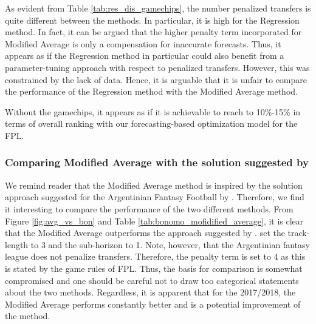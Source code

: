 \newpar

As evident from Table \ref{tab:res_dis_gamechips}, the number penalized transfers is quite different between the methods. In particular, it is high for the Regression method. In fact, it can be argued that the higher penalty term incorporated for Modified Average is only a compensation for inaccurate forecasts. Thus, it appears as if the Regression method in particular could also benefit from a parameter-tuning approach with respect to penalized transfers. However, this was constrained by the lack of data. Hence, it is arguable that it is unfair to compare the performance of the Regression method with the Modified Average method.

\newpar

Without the gamechips, it appears as if it is achievable to reach to 10\%-15\% in terms of overall ranking with our forecasting-based optimization model for the FPL.

\subsubsection{Comparing Modified Average with the solution suggested by \cite{Bonomo}}




We remind reader that the Modified Average method is inspired by the solution approach suggested for the Argentinian Fantasy Football by \cite{Bonomo}. Therefore, we find it interesting to compare the performance of the two different methods. From Figure \ref{fig:avg_vs_bon} and Table \ref{tab:bonomo_mofidified_average}, it is clear that the Modified Average outperforms the approach suggested by \cite{Bonomo}.\cite{Bonomo} set the track-length to 3 and the sub-horizon to 1. Note, however, that the Argentinian fantasy league does not penalize transfers. Therefore, the penalty term is set to 4 as this is stated by the game rules of FPL. Thus, the basis for comparison is somewhat compromised and one should be careful not to draw too categorical statements about the two methods. Regardless, it is apparent that for the 2017/2018, the Modified Average performs constantly better and is a potential improvement of the method.

